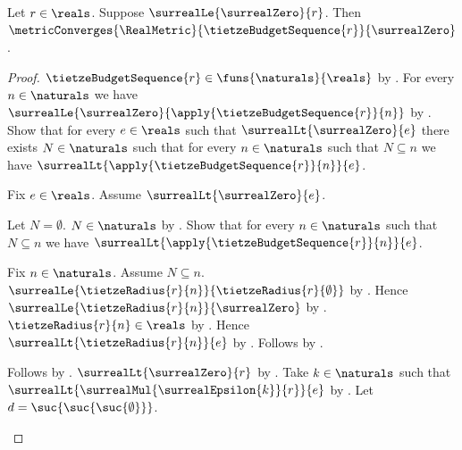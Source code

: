 \begin{theorem}\label{tietze_budget_sequence_converges_zero}
    Let $r\in\reals$.
    Suppose $\surrealLe{\surrealZero}{r}$.
    Then
        $\metricConverges{\RealMetric}
            {\tietzeBudgetSequence{r}}{\surrealZero}$.
\end{theorem}
\begin{proof}
    $\tietzeBudgetSequence{r}\in\funs{\naturals}{\reals}$
        by .
    For every $n\in\naturals$ we have
        $\surrealLe{\surrealZero}{\apply{\tietzeBudgetSequence{r}}{n}}$
        by .
    Show that for every $e\in\reals$ such that
        $\surrealLt{\surrealZero}{e}$ there exists $N\in\naturals$
        such that for every $n\in\naturals$ such that $N\subseteq n$
            we have $\surrealLt{\apply{\tietzeBudgetSequence{r}}{n}}{e}$.
    \begin{subproof}
        Fix $e\in\reals$.
        Assume $\surrealLt{\surrealZero}{e}$.
        \begin{byCase}
            Let $N=\emptyset$.
            $N\in\naturals$ by .
            Show that for every $n\in\naturals$ such that $N\subseteq n$
                we have
                    $\surrealLt{\apply{\tietzeBudgetSequence{r}}{n}}{e}$.
            \begin{subproof}
                Fix $n\in\naturals$.
                Assume $N\subseteq n$.
                $\surrealLe{\tietzeRadius{r}{n}}
                    {\tietzeRadius{r}{\emptyset}}$
                    by .
                Hence $\surrealLe{\tietzeRadius{r}{n}}{\surrealZero}$
                    by .
                $\tietzeRadius{r}{n}\in\reals$
                    by .
                Hence $\surrealLt{\tietzeRadius{r}{n}}{e}$
                    by
                    .
                Follows by .
            \end{subproof}
            Follows by \auto.
            $\surrealLt{\surrealZero}{r}$
                by
                .
            Take $k\in\naturals$ such that
                $\surrealLt{\surrealMul{\surrealEpsilon{k}}{r}}{e}$
                by .
            Let $d=\suc{\suc{\suc{\emptyset}}}$.

\end{byCase}
\end{subproof}
\end{proof}

